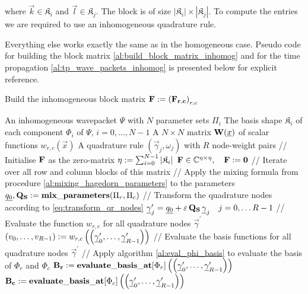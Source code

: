 where $\vec{k} \in \mathfrak{K}_i$ and $\vec{l} \in \mathfrak{K}_j$. The block is
of size $|\mathfrak{K}_i| \times |\mathfrak{K}_j|$. To compute the entries we are
required to use an inhomogeneous quadrature rule.

Everything else works exactly the same as in the homogeneous case. Pseudo code
for building the block matrix \ref{al:build_block_matrix_inhomog} and for the
time propagation \ref{al:tp_wave_packets_inhomog} is presented below for explicit
reference.


\begin{algorithm}
\caption{Build the inhomogeneous block matrix $\mathbf{F} := \left(\mathbf{F_{r,c}}\right)_{r,c}$}
\label{al:build_block_matrix_inhomog}
\begin{algorithmic}
  \REQUIRE An inhomogeneous wavepacket $\Psi$ with $N$ parameter sets $\Pi_i$
  \REQUIRE The basis shape $\mathfrak{K}_i$ of each component $\Phi_i$ of $\Psi$, $i = 0,\ldots, N-1$
  \REQUIRE A $N \times N$ matrix $\mathbf{W}(\underline{x})$ of scalar functions $w_{r,c}(\vec{x})$
  \REQUIRE A quadrature rule $(\vec{\gamma}_j, \omega_j)$ with $R$ node-weight pairs
  \STATE // Initialise $\mathbf{F}$ as the zero-matrix
  \STATE $\eta := \sum_{i=0}^{N-1} |\mathfrak{K}_i|$
  \STATE $\mathbf{F} \in \mathbb{C}^{\eta \times \eta}, \quad \mathbf{F} := \mathbf{0}$
  \STATE // Iterate over all row and column blocks of this matrix
      \STATE // Apply the mixing formula from procedure \ref{al:mixing_hagedorn_parameters} to the parameters
      \STATE $\underline{q_0}, \mathbf{Q_S} := \mathbf{mix\_parameters}(\Pi_r, \Pi_c)$
      \STATE // Transform the quadrature nodes according to \eqref{eq:transform_qr_nodes}
      \STATE $\underline{\gamma}_j^\prime = \underline{q_0} + \varepsilon \, \mathbf{Q_S} \, \underline{\gamma}_j \quad j = 0, \ldots R-1$
      \STATE // Evaluate the function $w_{r,c}$ for all quadrature nodes $\vec{\gamma}^\prime$
      \STATE $\left(v_0, \ldots, v_{R-1}\right) := w_{r,c}\left( \left(\underline{\gamma}^\prime_0, \ldots, \underline{\gamma}^\prime_{R-1}\right) \right)$
      \STATE // Evaluate the basis functions for all quadrature nodes $\vec{\gamma}^\prime$
      \STATE // Apply algorithm \ref{al:eval_phi_basis} to evaluate the basis of $\Phi_r$ and $\Phi_c$
      \STATE $\mathbf{B_r} := \mathbf{evaluate\_basis\_at}[\Phi_r]\left(\left(\underline{\gamma}_0^\prime, \ldots, \underline{\gamma}_{R-1}^\prime\right)\right)$
      \STATE $\mathbf{B_c} := \mathbf{evaluate\_basis\_at}[\Phi_c]\left(\left(\underline{\gamma}_0^\prime, \ldots, \underline{\gamma}_{R-1}^\prime\right)\right)$

\end{algorithmic}
\end{algorithm}

